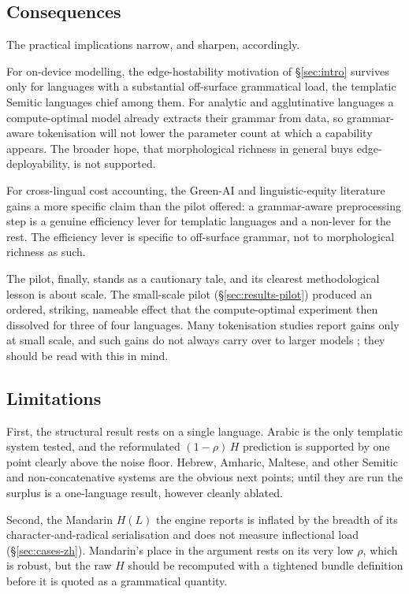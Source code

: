 \subsection{Consequences}
\label{sec:discussion-consequences}

The practical implications narrow, and sharpen, accordingly.

For on-device modelling, the edge-hostability motivation of \S\ref{sec:intro} survives only for languages with a substantial off-surface grammatical load, the templatic Semitic languages chief among them. For analytic and agglutinative languages a compute-optimal model already extracts their grammar from data, so grammar-aware tokenisation will not lower the parameter count at which a capability appears. The broader hope, that morphological richness in general buys edge-deployability, is not supported.

For cross-lingual cost accounting, the Green-AI and linguistic-equity literature \citep{schwartz2020, bender2021, ahia2023} gains a more specific claim than the pilot offered: a grammar-aware preprocessing step is a genuine efficiency lever for templatic languages and a non-lever for the rest. The efficiency lever is specific to off-surface grammar, not to morphological richness as such.

The pilot, finally, stands as a cautionary tale, and its clearest methodological lesson is about scale. The small-scale pilot (\S\ref{sec:results-pilot}) produced an ordered, striking, nameable effect that the compute-optimal experiment then dissolved for three of four languages. Many tokenisation studies report gains only at small scale, and such gains do not always carry over to larger models \citep{lotz2025}; they should be read with this in mind.

\subsection{Limitations}
\label{sec:discussion-limitations}

First, the structural result rests on a single language. Arabic is the only templatic system tested, and the reformulated $(1-\rho)\,H$ prediction is supported by one point clearly above the noise floor. Hebrew, Amharic, Maltese, and other Semitic and non-concatenative systems are the obvious next points; until they are run the surplus is a one-language result, however cleanly ablated.

Second, the Mandarin $H(L)$ the engine reports is inflated by the breadth of its character-and-radical serialisation and does not measure inflectional load (\S\ref{sec:cases-zh}). Mandarin's place in the argument rests on its very low $\rho$, which is robust, but the raw $H$ should be recomputed with a tightened bundle definition before it is quoted as a grammatical quantity.

